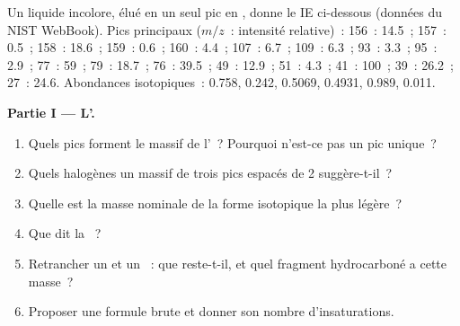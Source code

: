\begin{problem}
\label{pb:b2:mass-spec-atomic:1}
Un liquide incolore, élué en un seul pic en , donne le  IE
ci-dessous (données du NIST WebBook). Pics principaux ($m/z$~: intensité relative)~: 156~: 14.5~;
157~: 0.5~; 158~: 18.6~; 159~: 0.6~; 160~: 4.4~; 107~: 6.7~; 109~: 6.3~; 93~: 3.3~; 95~: 2.9~; 77~: 59~;
79~: 18.7~; 76~: 39.5~; 49~: 12.9~; 51~: 4.3~; 41~: 100~; 39~: 26.2~; 27~: 24.6. Abondances isotopiques~:
 0.758,  0.242,  0.5069,
 0.4931,  0.989,  0.011.

\begin{center}
\end{center}

\medskip
\noindent\textbf{Partie I --- L'.}
\begin{enumerate}
  \item Quels pics forment le massif de l'~? Pourquoi n'est-ce pas un pic unique~?
  \item Quels halogènes un massif de trois pics espacés de 2 suggère-t-il~?
  \item Quelle est la masse nominale de la forme isotopique la plus légère~?
  \item Que dit la ~?
  \item Retrancher un  et un ~: que reste-t-il, et quel fragment hydrocarboné a cette
        masse~?
  \item Proposer une formule brute et donner son nombre d'insaturations.
\end{enumerate}


\end{problem}
